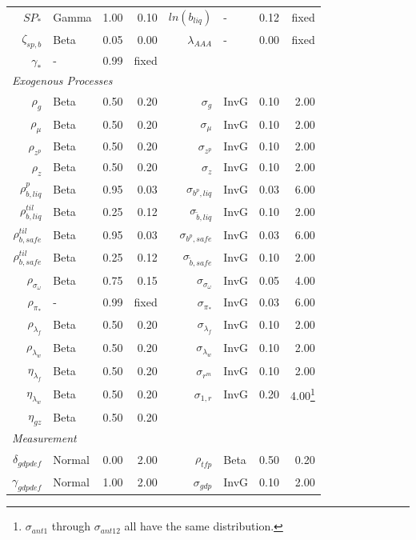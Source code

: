 \documentclass[12pt]{article}
\begin{document}
{\begin{longtable}{rlrr@{\hspace{1in}}rlrr}
$SP_*$ & Gamma & 1.00 & 0.10 & $ln(b_{liq})$ & - & 0.12 & \scriptsize{fixed} \\
$\zeta_{sp,b}$ & Beta & 0.05 & 0.00 & $\lambda_{AAA}$ & - & 0.00 & \scriptsize{fixed} \\
$\gamma_*$ & - & 0.99 & \scriptsize{fixed} && & & \\[3pt]
\multicolumn{8}{l}{\textit{Exogenous Processes}} \\[3pt]
$\rho_g$ & Beta & 0.50 & 0.20 & $\sigma_{g}$ & InvG & 0.10 & 2.00 \\
$\rho_{\mu}$ & Beta & 0.50 & 0.20 & $\sigma_{\mu}$ & InvG & 0.10 & 2.00 \\
$\rho_{z^p}$ & Beta & 0.50 & 0.20 & $\sigma_{z^p}$ & InvG & 0.10 & 2.00 \\
$\rho_z$ & Beta & 0.50 & 0.20 & $\sigma_{z}$ & InvG & 0.10 & 2.00 \\
$\rho_{b,liq}^{p}$ & Beta & 0.95 & 0.03 & $\sigma_{b^p, liq}$ & InvG & 0.03 & 6.00 \\
$\rho_{b,liq}^{til}$ & Beta & 0.25 & 0.12 & $\sigma_{\tilde{b}, liq}$ & InvG & 0.10 & 2.00 \\
$\rho_{b,safe}^{til}$ & Beta & 0.95 & 0.03 & $\sigma_{b^p, safe}$ & InvG & 0.03 & 6.00 \\
$\rho_{b,safe}^{til}$ & Beta & 0.25 & 0.12 & $\sigma_{\tilde{b}, safe}$ & InvG & 0.10 & 2.00 \\
$\rho_{\sigma_\omega}$ & Beta & 0.75 & 0.15 & $\sigma_{\sigma_\omega}$ & InvG & 0.05 & 4.00 \\
$\rho_{\pi_*}$ & - & 0.99 & \scriptsize{fixed} & $\sigma_{\pi_*}$ & InvG & 0.03 & 6.00 \\
$\rho_{\lambda_f}$ & Beta & 0.50 & 0.20 & $\sigma_{\lambda_f}$ & InvG & 0.10 & 2.00 \\
$\rho_{\lambda_w}$ & Beta & 0.50 & 0.20 & $\sigma_{\lambda_w}$ & InvG & 0.10 & 2.00 \\
$\eta_{\lambda_f}$ & Beta & 0.50 & 0.20 & $\sigma_{r^m}$ & InvG & 0.10 & 2.00 \\
$\eta_{\lambda_w}$ & Beta & 0.50 & 0.20 & $\sigma_{1,r}$ & InvG & 0.20 & 4.00\let\thefootnote\relax\footnote{\centering $\sigma_{ant1}$ through $\sigma_{ant12}$ all have the same distribution.} \\
$\eta_{gz}$ & Beta & 0.50 & 0.20 && & & \\[3pt]
\multicolumn{8}{l}{\textit{Measurement}} \\[3pt]
$\delta_{gdpdef}$ & Normal & 0.00 & 2.00 & $\rho_{tfp}$ & Beta & 0.50 & 0.20 \\
$\gamma_{gdpdef}$ & Normal & 1.00 & 2.00 & $\sigma_{gdp}$ & InvG & 0.10 & 2.00 \\

\end{longtable}}
\end{document}
